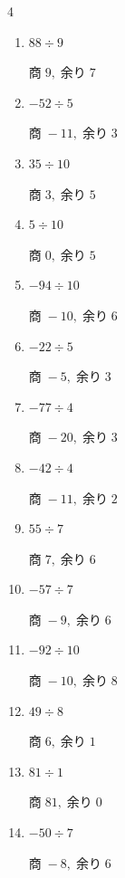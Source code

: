 \begin{multicols}{4}
\begin{enumerate}
        $商\; 10,\; 余り\; 0$

  \item $88 \div 9$

        $商\; 9,\; 余り\; 7$

  \item $-52 \div 5$

        $商\; -11,\; 余り\; 3$

  \item $35 \div 10$

        $商\; 3,\; 余り\; 5$

  \item $5 \div 10$

        $商\; 0,\; 余り\; 5$

  \item $-94 \div 10$

        $商\; -10,\; 余り\; 6$

  \item $-22 \div 5$

        $商\; -5,\; 余り\; 3$

  \item $-77 \div 4$

        $商\; -20,\; 余り\; 3$

  \item $-42 \div 4$

        $商\; -11,\; 余り\; 2$

  \item $55 \div 7$

        $商\; 7,\; 余り\; 6$

  \item $-57 \div 7$

        $商\; -9,\; 余り\; 6$

  \item $-92 \div 10$

        $商\; -10,\; 余り\; 8$

  \item $49 \div 8$

        $商\; 6,\; 余り\; 1$

  \item $81 \div 1$

        $商\; 81,\; 余り\; 0$

\columnbreak %

\resetques

  \item $-50 \div 7$

        $商\; -8,\; 余り\; 6$


\end{enumerate}
\end{multicols}
